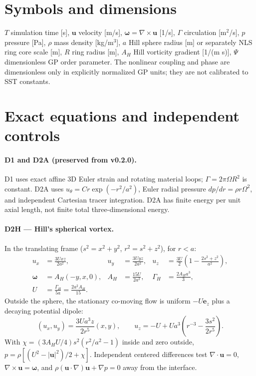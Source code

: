 \documentclass[10pt,a4paper]{article}
\begin{document}
\section{Symbols and dimensions}
$T$ simulation time [s], $\mathbf u$ velocity [m/s], $\boldsymbol\omega=\nabla\times\mathbf u$ [1/s], $\Gamma$ circulation [m$^2$/s], $p$ pressure [Pa], $\rho$ mass density [kg/m$^3$], $a$ Hill sphere radius [m] or separately NLS ring core scale [m], $R$ ring radius [m], $A_H$ Hill vorticity gradient [1/(m s)], $\Psi$ dimensionless GP order parameter. The nonlinear coupling and phase are dimensionless only in explicitly normalized GP units; they are not calibrated to SST constants.
\section{Exact equations and independent controls}
\paragraph{D1 and D2A (preserved from v0.2.0).} D1 uses exact affine 3D Euler strain and rotating material loops; $\Gamma=2\pi\Omega R^2$ is constant. D2A uses $u_\theta=Cr\exp(-r^2/a^2)$, Euler radial pressure $dp/dr=\rho r\Omega^2$, and independent Cartesian tracer integration. D2A has finite energy per unit axial length, not finite total three-dimensional energy.
\paragraph{D2H --- Hill's spherical vortex.}
In the translating frame ($s^2=x^2+y^2$, $r^2=s^2+z^2$), for $r<a$:
\begin{align}
 u_x&=\frac{3Uxz}{2a^2},&u_y&=\frac{3Uyz}{2a^2},&u_z&=\frac{3U}{2}\left(1-\frac{2s^2+z^2}{a^2}\right),\\
 \boldsymbol\omega&=A_H(-y,x,0),&A_H&=\frac{15U}{2a^2},&\Gamma_H&=\frac{2A_H a^3}{3},\\
 U&=\frac{\Gamma_H}{5a}=\frac{2a^2A_H}{15}.
\end{align}
Outside the sphere, the stationary co-moving flow is uniform $-U\mathbf e_z$ plus a decaying potential dipole:
\begin{equation}
 (u_x,u_y)=\frac{3Ua^3z}{2r^5}(x,y),\qquad u_z=-U+Ua^3\left(r^{-3}-\frac{3s^2}{2r^5}\right).
\end{equation}
With $\chi=(3A_HU/4)s^2(r^2/a^2-1)$ inside and zero outside, $p=\rho[(U^2-|\mathbf u|^2)/2+\chi]$. Independent centered differences test $\nabla\cdot\mathbf u=0$, $\nabla\times\mathbf u=\boldsymbol\omega$, and $\rho(\mathbf u\cdot\nabla)\mathbf u+\nabla p=0$ away from the interface.
\end{document}

